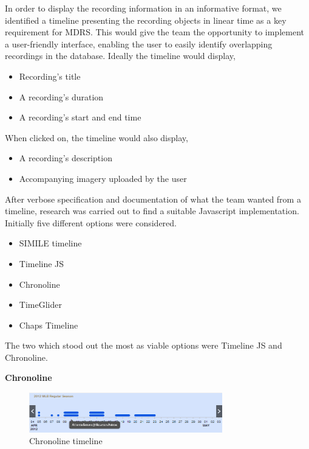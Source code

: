 \documentclass{l3proj}
\begin{document}

In order to display the recording information in an informative format, we identified a timeline presenting the recording objects in linear time as a key requirement for MDRS. This would give the team the opportunity to implement a user-friendly interface, enabling the user to easily identify overlapping recordings in the database. Ideally the timeline would display,

\begin{itemize}
\item{Recording's title}
\item{A recording's duration}
\item{A recording's start and end time}
\end{itemize}

When clicked on, the timeline would also display,
\begin{itemize}
\item{A recording's description}
\item{Accompanying imagery uploaded by the user}
\end{itemize}

After verbose specification and documentation of what the team wanted from a timeline, research was carried out to find a suitable \gls{Javascript} implementation. Initially five different options were considered.
\begin{itemize}
\item{SIMILE timeline\cite{SIMILE}}
\item{Timeline JS\cite{TimelineJS}}
\item{Chronoline\cite{Chronoline}}
\item{TimeGlider\cite{TimegliderGithub}}
\item{Chaps Timeline\cite{Chaps}}
\end{itemize}
The two which stood out the most as viable options were Timeline JS and Chronoline.

\textbf{Chronoline}
\begin{figure}[ht!]
  \centering
\includegraphics[width=0.75\textwidth]{images/Chronoline.png}
\caption{Chronoline timeline}
\end{figure}
\end{document}
